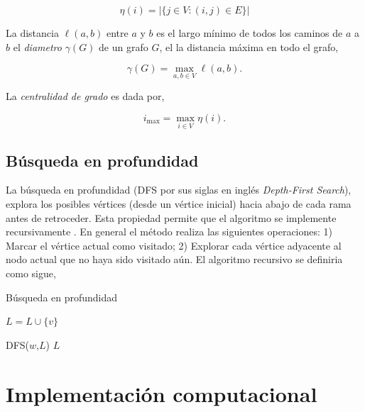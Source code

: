 \documentclass[letterpaper,11pt]{article}
\begin{document}
\begin{equation}
\eta(i) = |\{ j \in V : (i,j) \in E \}|
\label{eq:grado}
\end{equation}

La distancia $\ell(a,b)$ entre $a$ y $b$ es el largo mínimo de todos los caminos de $a$ a $b$ el \textit{diametro} $\gamma(G)$ de un grafo $G$, el la distancia máxima en todo el grafo,

\begin{equation}
\gamma(G) = \max_{a,b\in V}\ell(a,b).
\label{eq:distancia}
\end{equation}

La \textit{centralidad de grado} es dada por,

\begin{equation}
	i_{\max} = \max_{i\in V} \eta(i).
	\label{eq:centralidad}
\end{equation}



\subsection{Búsqueda en profundidad}

La búsqueda en profundidad (DFS por sus siglas en inglés \textit{Depth-First Search}), explora los posibles vértices (desde un vértice inicial) hacia abajo de cada rama antes de retroceder. Esta propiedad permite que el algoritmo se implemente recursivamente \cite{Papadimitriou1993}. En general el método realiza las siguientes operaciones: 1) Marcar el vértice actual como visitado; 2) Explorar cada vértice adyacente al nodo actual que no haya sido visitado aún. El algoritmo recursivo se definiria como sigue,

\begin{algorithm}
\caption{Búsqueda en profundidad}\label{euclid}
\begin{algorithmic}[1]
\State $L= L\cup \{v\}$

\State DFS($w$,$L$)
\EndFor
\Return $L$
\EndProcedure
\end{algorithmic}
\end{algorithm}


\section{Implementación computacional}
\end{document}
